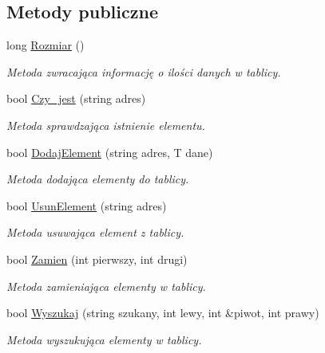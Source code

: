\subsection*{\-Metody publiczne}
\begin{DoxyCompactItemize}
\item 
long \hyperlink{class_tablica_asocjacyjna_aa73ffd094410a190b69b0dbe294f0489}{\-Rozmiar} ()
\begin{DoxyCompactList}\small\item\em \-Metoda zwracająca informację o ilości danych w tablicy. \end{DoxyCompactList}\item 
bool \hyperlink{class_tablica_asocjacyjna_a21bae8b633b7bde70eab9200de870086}{\-Czy\-\_\-jest} (string adres)
\begin{DoxyCompactList}\small\item\em \-Metoda sprawdzająca istnienie elementu. \end{DoxyCompactList}\item 
bool \hyperlink{class_tablica_asocjacyjna_addfeb9ac2475f95e8c43eed5dfad8866}{\-Dodaj\-Element} (string adres, \-T dane)
\begin{DoxyCompactList}\small\item\em \-Metoda dodająca elementy do tablicy. \end{DoxyCompactList}\item 
bool \hyperlink{class_tablica_asocjacyjna_afdb88bfafe2bfb4171dd5ecab799b3b3}{\-Usun\-Element} (string adres)
\begin{DoxyCompactList}\small\item\em \-Metoda usuwająca element z tablicy. \end{DoxyCompactList}\item 
bool \hyperlink{class_tablica_asocjacyjna_a643d1c054d657c21db830dfe1b5232ab}{\-Zamien} (int pierwszy, int drugi)
\begin{DoxyCompactList}\small\item\em \-Metoda zamieniająca elementy w tablicy. \end{DoxyCompactList}\item 
bool \hyperlink{class_tablica_asocjacyjna_a689a3a17ff3a0595ffdefb38b7a2575f}{\-Wyszukaj} (string szukany, int lewy, int \&piwot, int prawy)
\begin{DoxyCompactList}\small\item\em \-Metoda wyszukująca elementy w tablicy. \end{DoxyCompactList}\item 

\end{DoxyCompactItemize}
